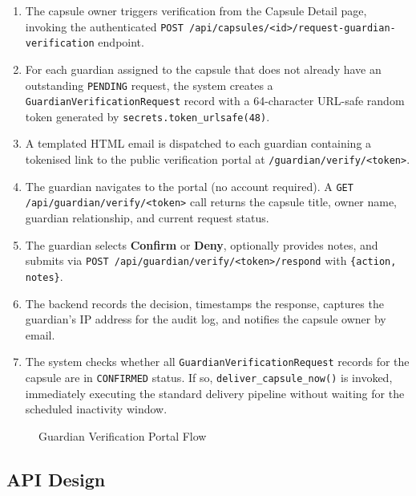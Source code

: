 \documentclass[12pt, a4paper]{article}
\begin{document}
\begin{enumerate}
  \item The capsule owner triggers verification from the Capsule Detail page, invoking the authenticated \texttt{POST /api/capsules/<id>/request-guardian-verification} endpoint.
  \item For each guardian assigned to the capsule that does not already have an outstanding \texttt{PENDING} request, the system creates a \texttt{GuardianVerificationRequest} record with a 64-character URL-safe random token generated by \texttt{secrets.token\_urlsafe(48)}.
  \item A templated HTML email is dispatched to each guardian containing a tokenised link to the public verification portal at \texttt{/guardian/verify/<token>}.
  \item The guardian navigates to the portal (no account required). A \texttt{GET /api/guardian/verify/<token>} call returns the capsule title, owner name, guardian relationship, and current request status.
  \item The guardian selects \textbf{Confirm} or \textbf{Deny}, optionally provides notes, and submits via \texttt{POST /api/guardian/verify/<token>/respond} with \texttt{\{action, notes\}}.
  \item The backend records the decision, timestamps the response, captures the guardian's IP address for the audit log, and notifies the capsule owner by email.
  \item The system checks whether all \texttt{GuardianVerificationRequest} records for the capsule are in \texttt{CONFIRMED} status. If so, \texttt{deliver\_capsule\_now()} is invoked, immediately executing the standard delivery pipeline without waiting for the scheduled inactivity window.
\end{enumerate}

\begin{figure}[H]
  \centering
  \caption{Guardian Verification Portal Flow}
  \label{fig:guardian_flow}
\end{figure}

\subsection{API Design}
\end{document}
